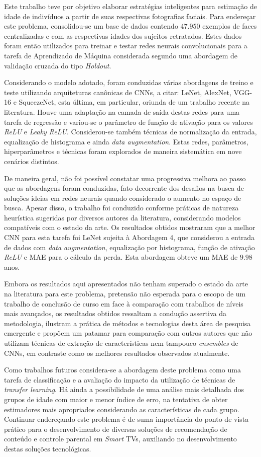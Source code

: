 Este trabalho teve por objetivo elaborar estratégias inteligentes para estimação de idade de indivíduos a partir de suas respectivas fotografias faciais. Para endereçar este problema, consolidou-se um base de dados contendo $47.950$ exemplos de faces centralizadas e com as respectivas idades dos sujeitos retratados. Estes dados foram então utilizados para treinar e testar redes neurais convolucionais para a tarefa de Aprendizado de Máquina considerada segundo uma abordagem de validação cruzada do tipo \emph{Holdout}.

Considerando o modelo adotado, foram conduzidas várias abordagens de treino e teste utilizando arquiteturas canônicas de CNNs, a citar: LeNet, AlexNet, VGG-16 e SqueezeNet, esta última, em particular, oriunda de um trabalho recente na literatura. Houve uma adaptação na camada de saída destas redes para uma tarefa de regressão e variou-se o parâmetro de função de ativação para os valores \emph{ReLU} e \emph{Leaky ReLU}. Considerou-se também técnicas de normalização da entrada, equalização de histograma e ainda \emph{data augmentation}. Estas redes, parâmetros, hiperparâmetros e técnicas foram explorados de maneira sistemática em nove cenários distintos.

De maneira geral, não foi possível constatar uma progressiva melhora ao passo que as abordagens foram conduzidas, fato decorrente dos desafios na busca de soluções ideias em redes neurais quando considerado o aumento no espaço de busca. Apesar disso, o trabalho foi conduzido conforme práticas de natureza heurística sugeridas por diversos autores da literatura, considerando modelos compatíveis com o estado da arte. Os resultados obtidos mostraram que a melhor CNN para esta tarefa foi LeNet sujeita à Abordagem 4, que considerou a entrada de dados com \emph{data augmentation}, equalização por histograma, função de ativação \emph{ReLU} e MAE para o cálculo da perda. Esta abordagem obteve um MAE de $9.98$ anos.

Embora os resultados aqui apresentados não tenham superado o estado da arte na literatura para este problema, pretensão não esperada para o escopo de um trabalho de conclusão de curso em face à comparação com trabalhos de níveis mais avançados, os resultados obtidos ressaltam a condução assertiva da metodologia, ilustram a prática de métodos e tecnologias desta área de pesquisa emergente e propõem um patamar para comparação com outros autores que não utilizam técnicas de extração de características nem tampouco \emph{ensembles} de CNNs, em contraste como os melhores resultados observados atualmente.

Como trabalhos futuros considera-se a abordagem deste problema como uma tarefa de classificação e a avaliação do impacto da utilização de técnicas de \emph{transfer learning}. Há ainda a possibilidade de uma análise mais detalhada dos grupos de idade com maior e menor índice de erro, na tentativa de obter estimadores mais apropriados considerando as características de cada grupo.  Continuar endereçando este problema é de suma importância do ponto de vista prático para o desenvolvimento de diversas soluções de recomendação de conteúdo e controle parental em \emph{Smart} TVs, auxiliando no desenvolvimento destas soluções tecnológicas.
